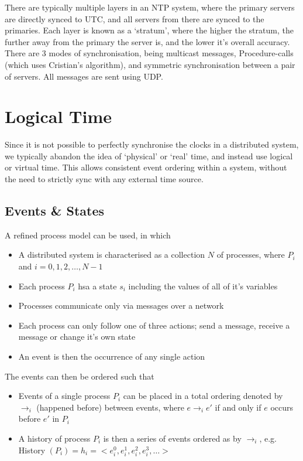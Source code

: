 There are typically multiple layers in an NTP system, where the primary servers are directly synced to UTC, and all servers from there are synced to the primaries. Each layer is known as a `stratum', where the higher the stratum, the further away from the primary the server is, and the lower it's overall accuracy. There are 3 modes of synchronisation, being multicast messages, Procedure-calls (which uses Cristian's algorithm), and symmetric synchronisation between a pair of servers. All messages are sent using UDP.

\section*{Logical Time}

Since it is not possible to perfectly synchronise the clocks in a distributed system, we typically abandon the idea of `physical' or `real' time, and instead use logical or virtual time. This allows consistent event ordering within a system, without the need to strictly sync with any external time source.

\subsection*{Events \& States}

A refined process model can be used, in which
\begin{itemize}
  \item A distributed system is characterised as a collection $N$ of processes, where $P_i$ and $i = 0, 1, 2, \ldots, N-1$
  \item Each process $P_i$ hsa a state $s_i$ including the values of all of it's variables
  \item Processes communicate only via messages over a network
  \item Each process can only follow one of three actions; send a message, receive a message or change it's own state
  \item An event is then the occurrence of any single action
\end{itemize}

The events can then be ordered such that
\begin{itemize}
  \item Events of a single process $P_i$ can be placed in a total ordering denoted by $\rightarrow_i$ (happened before) between events, where $e \rightarrow_i e'$ if and only if $e$ occurs before $e'$ in $P_i$
  \item A history of process $P_i$ is then a series of events ordered as by $\rightarrow_i$, e.g. History $(P_i) = h_i = < e_i^0, e_i^1, e_i^2, e_i^3, \ldots >$
\end{itemize}

